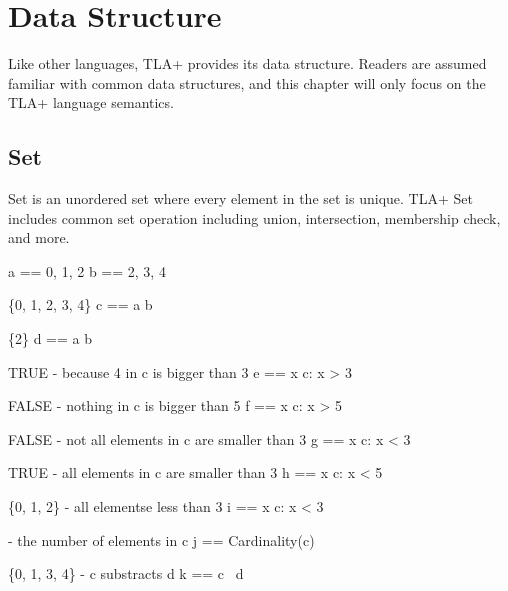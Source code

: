 
% 

\chapter{Data Structure}

Like other languages, TLA+ provides its data structure. Readers are assumed
familiar with common data structures, and this chapter will only focus on the
TLA+ language semantics.

\section{Set}

Set is an unordered set where every element in the set is unique. TLA+ Set
includes common set operation including union, intersection, membership check,
and more.\newline

\begin{tla}
a == {0, 1, 2}
b == {2, 3, 4}

\* \{0, 1, 2, 3, 4\}
c == a \union b         

\* \{2\}
d == a \intersect b     

\* TRUE - because 4 in c is bigger than 3
e == \E x \in c: x > 3  

\* FALSE - nothing in c is bigger than 5
f == \E x \in c: x > 5  

\* FALSE - not all elements in c are smaller than 3
g == \A x \in c: x < 3  

\* TRUE - all elements in c are smaller than 3
h == \A x \in c: x < 5  

\* \{0, 1, 2\} - all elementse less than 3
i == {x \in c: x < 3}   

 - the number of elements in c
j == Cardinality(c)     

\* \{0, 1, 3, 4\} - c substracts d
k == c \ d             
\end{tla}
\begin{tlatex}
%
%
\@pvspace{8.0pt}%
\@x{}%
%
\@xx{}%
%
\@pvspace{8.0pt}%
\@x{}%
%
\@xx{}%
%
\@pvspace{8.0pt}%
\@x{}%
%
\@xx{}%
%
\@pvspace{8.0pt}%
\@x{}%
%
\@xx{}%
%
\@pvspace{8.0pt}%
\@x{}%
%
\@xx{}%
%
\@pvspace{8.0pt}%
\@x{}%
%
\@xx{}%
%
\@pvspace{8.0pt}%
\@x{}%
%
\@xx{}%
%
\@pvspace{8.0pt}%
\@x{}%
%
\@xx{}%
%
\@pvspace{8.0pt}%
\@x{}%
%
\@xx{}%
%
\end{tlatex}

